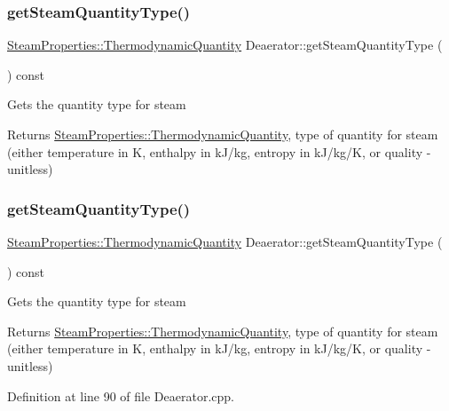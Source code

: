 \subsubsection{\texorpdfstring{get\+Steam\+Quantity\+Type()}{getSteamQuantityType()}\hspace{0.1cm}{\footnotesize\ttfamily [1/3]}}
{\footnotesize\ttfamily \hyperlink{class_steam_properties_ae0294bedf7d178c2d8fb6aed0f62fbff}{Steam\+Properties\+::\+Thermodynamic\+Quantity} Deaerator\+::get\+Steam\+Quantity\+Type (\begin{DoxyParamCaption}{ }\end{DoxyParamCaption}) const}

Gets the quantity type for steam \begin{DoxyReturn}{Returns}
\hyperlink{class_steam_properties_ae0294bedf7d178c2d8fb6aed0f62fbff}{Steam\+Properties\+::\+Thermodynamic\+Quantity}, type of quantity for steam (either temperature in K, enthalpy in k\+J/kg, entropy in k\+J/kg/K, or quality -\/ unitless) 
\end{DoxyReturn}
\mbox{\label{class_deaerator_a18abbdc5ec78f71e1d2495b0c64c77ec}} 
\subsubsection{\texorpdfstring{get\+Steam\+Quantity\+Type()}{getSteamQuantityType()}\hspace{0.1cm}{\footnotesize\ttfamily [2/3]}}
{\footnotesize\ttfamily \hyperlink{class_steam_properties_ae0294bedf7d178c2d8fb6aed0f62fbff}{Steam\+Properties\+::\+Thermodynamic\+Quantity} Deaerator\+::get\+Steam\+Quantity\+Type (\begin{DoxyParamCaption}{ }\end{DoxyParamCaption}) const}

Gets the quantity type for steam \begin{DoxyReturn}{Returns}
\hyperlink{class_steam_properties_ae0294bedf7d178c2d8fb6aed0f62fbff}{Steam\+Properties\+::\+Thermodynamic\+Quantity}, type of quantity for steam (either temperature in K, enthalpy in k\+J/kg, entropy in k\+J/kg/K, or quality -\/ unitless) 
\end{DoxyReturn}


Definition at line 90 of file Deaerator.\+cpp.

